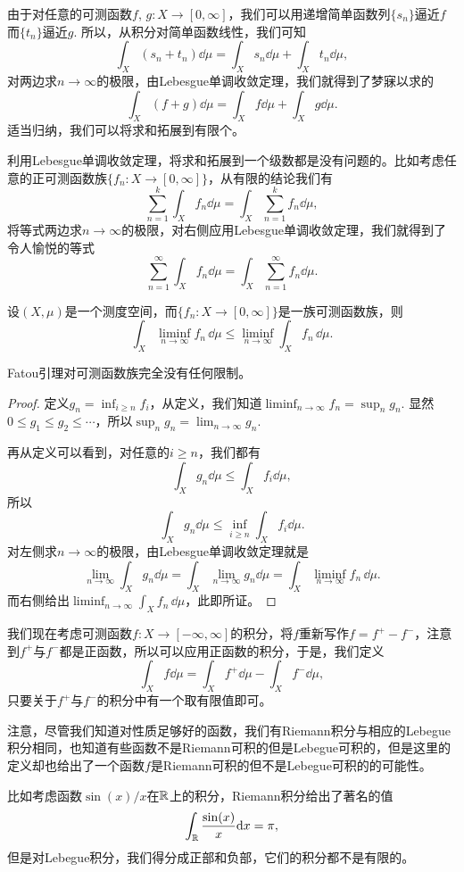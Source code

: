 由于对任意的可测函数$f$, $g:X\to [0,\infty]$，我们可以用递增简单函数列$\{s_n\}$逼近$f$而$\{t_n\}$逼近$g$. 所以，从积分对简单函数线性，我们可知
\[
	\int_X (s_n+t_n)\dd \mu=\int_X s_n\dd \mu+\int_X t_n\dd \mu,
\]
对两边求$n\to \infty$的极限，由Lebesgue单调收敛定理，我们就得到了梦寐以求的
\[
	\int_X (f+g)\dd \mu=\int_X f\dd \mu+\int_X g\dd \mu.
\]
适当归纳，我们可以将求和拓展到有限个。

利用Lebesgue单调收敛定理，将求和拓展到一个级数都是没有问题的。比如考虑任意的正可测函数族$\{f_n:X\to [0,\infty]\}$，从有限的结论我们有
\[
	\sum_{n=1}^k \int_{X} f_n \dd\mu=\int_{X}\sum_{n=1}^k f_n \dd\mu,
\]
将等式两边求$n\to \infty$的极限，对右侧应用Lebesgue单调收敛定理，我们就得到了令人愉悦的等式
\[
	\sum_{n=1}^\infty \int_{X} f_n \dd\mu=\int_{X}\sum_{n=1}^\infty f_n \dd\mu.
\]

\begin{pro}[Fatou引理]
设$(X,\mu)$是一个测度空间，而$\{f_n:X\to [0,\infty]\}$是一族可测函数族，则
\[
	\int_{X}\liminf_{n\to \infty }f_{n}\,\dd\mu \leq \liminf_{n\to \infty }\int_{X}f_{n}\,\dd\mu.
\]
\end{pro}

Fatou引理对可测函数族完全没有任何限制。

\begin{proof}
定义$g_n=\inf_{i\geq n}f_i$，从定义，我们知道$\liminf_{n\to \infty }f_{n}=\sup_n g_n$. 显然$0\leq g_1\leq g_2\leq \cdots$，所以$\sup_n g_n=\lim_{n\to\infty}g_n$.

再从定义可以看到，对任意的$i\geq n$，我们都有
\[
	\int_X g_n\dd \mu\leq \int_X f_i\dd \mu,
\]
所以
\[
	\int_X g_n\dd \mu\leq \inf_{i\geq n}\int_X f_i\dd \mu.
\]
对左侧求$n\to\infty$的极限，由Lebesgue单调收敛定理就是
\[
	\lim_{n\to\infty}\int_X g_n\dd \mu=\int_X \lim_{n\to\infty}g_n\dd \mu=\int_{X}\liminf_{n\to \infty }f_{n}\,\dd\mu.
\]
而右侧给出$\liminf_{n\to \infty }\int_{X}f_{n}\,\dd\mu$，此即所证。
\end{proof}

\begin{para}
我们现在考虑可测函数$f:X\to [-\infty,\infty]$的积分，将$f$重新写作$f=f^+-f^-$，注意到$f^+$与$f^-$都是正函数，所以可以应用正函数的积分，于是，我们定义
\[
	\int_X f\dd \mu=\int_X f^+\dd \mu-\int_X f^-\dd \mu,
\]
只要关于$f^+$与$f^-$的积分中有一个取有限值即可。

注意，尽管我们知道对性质足够好的函数，我们有Riemann积分与相应的Lebegue积分相同，也知道有些函数不是Riemann可积的但是Lebegue可积的，但是这里的定义却也给出了一个函数$f$是Riemann可积的但不是Lebegue可积的的可能性。

比如考虑函数$\sin(x)/x$在$\mathbb{R}$上的积分，Riemann积分给出了著名的值
\[
	\int_{\mathbb{R}}\frac{\sin(x)}{x}\mathrm{d} x=\pi,
\]
但是对Lebegue积分，我们得分成正部和负部，它们的积分都不是有限的。
\end{para}

